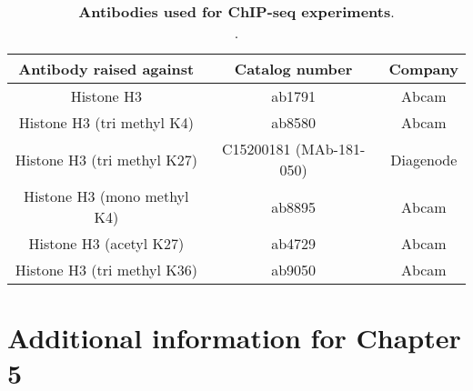 \begin{table}[h]
    \centering
    \begin{tabular}{c c c}
     Antibody raised against & Catalog number & Company  \\
    \hline
    Histone H3 & ab1791 & Abcam \\
    Histone H3 (tri methyl K4) & ab8580 & Abcam \\
    Histone H3 (tri methyl K27) & C15200181 (MAb-181-050)
 & Diagenode\\
    Histone H3 (mono methyl K4) & ab8895 & Abcam \\
    Histone H3 (acetyl K27) & ab4729 & Abcam \\
    Histone H3 (tri methyl K36) & ab9050 & Abcam \\
    \end{tabular}
    \caption[Antibodies used for ChIP-seq experiments]{\textbf{Antibodies used for ChIP-seq experiments}.\\
    .}
    \label{tab:endodiff_chipseq_antibodies}
\end{table}

\clearpage

\section{Additional information for Chapter 5}

